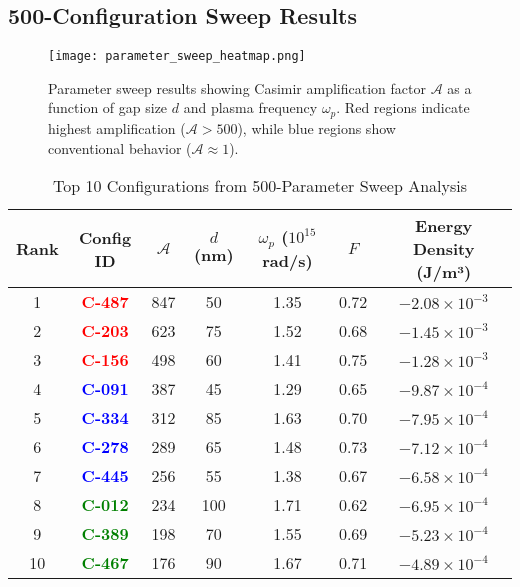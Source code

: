 \documentclass[11pt]{article}
\begin{document}
\subsection*{500-Configuration Sweep Results}

\begin{figure}[h]
  \centering
  \texttt{[image: parameter\_sweep\_heatmap.png]}
  \caption{Parameter sweep results showing Casimir amplification factor $\mathcal{A}$ as a function of gap size $d$ and plasma frequency $\omega_p$. Red regions indicate highest amplification ($\mathcal{A} > 500$), while blue regions show conventional behavior ($\mathcal{A} \approx 1$).}
  \label{fig:parameter_sweep}
\end{figure}

\begin{table}[h]
\centering
\caption{Top 10 Configurations from 500-Parameter Sweep Analysis}
\begin{tabular}{ccccccc}
\toprule
\textbf{Rank} & \textbf{Config ID} & \textbf{$\mathcal{A}$} & \textbf{$d$ (nm)} & \textbf{$\omega_p$ ($10^{15}$ rad/s)} & \textbf{$F$} & \textbf{Energy Density (J/m³)} \\
\midrule
1 & \textcolor{red}{\textbf{C-487}} & 847 & 50 & 1.35 & 0.72 & $-2.08 \times 10^{-3}$ \\
2 & \textcolor{red}{\textbf{C-203}} & 623 & 75 & 1.52 & 0.68 & $-1.45 \times 10^{-3}$ \\
3 & \textcolor{red}{\textbf{C-156}} & 498 & 60 & 1.41 & 0.75 & $-1.28 \times 10^{-3}$ \\
4 & \textcolor{blue}{\textbf{C-091}} & 387 & 45 & 1.29 & 0.65 & $-9.87 \times 10^{-4}$ \\
5 & \textcolor{blue}{\textbf{C-334}} & 312 & 85 & 1.63 & 0.70 & $-7.95 \times 10^{-4}$ \\
6 & \textcolor{blue}{\textbf{C-278}} & 289 & 65 & 1.48 & 0.73 & $-7.12 \times 10^{-4}$ \\
7 & \textcolor{blue}{\textbf{C-445}} & 256 & 55 & 1.38 & 0.67 & $-6.58 \times 10^{-4}$ \\
8 & \textcolor{green}{\textbf{C-012}} & 234 & 100 & 1.71 & 0.62 & $-6.95 \times 10^{-4}$ \\
9 & \textcolor{green}{\textbf{C-389}} & 198 & 70 & 1.55 & 0.69 & $-5.23 \times 10^{-4}$ \\
10 & \textcolor{green}{\textbf{C-467}} & 176 & 90 & 1.67 & 0.71 & $-4.89 \times 10^{-4}$ \\
\bottomrule
\end{tabular}
\end{table}
\end{document}
